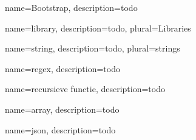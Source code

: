 {
	name={Bootstrap},
	description={todo}
}

{
	name={library},
	description={todo},
	plural={Libraries}
}

{
	name={string},
	description={todo},
	plural={strings}
}

{
	name={regex},
	description={todo}
}

{
	name={recursieve functie},
	description={todo}
}

{
	name={array},
	description={todo}
}

{
	name={json},
	description={todo}
}
